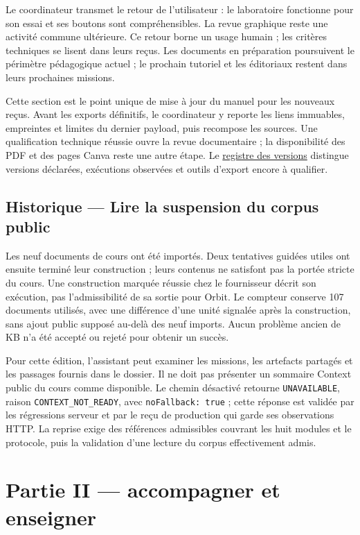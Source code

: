 \documentclass[
  canadien,
  11pt,
  a4paper,
]{report}
\begin{document}
Le coordinateur transmet le retour de l'utilisateur : le laboratoire
fonctionne pour son essai et ses boutons sont compréhensibles. La revue
graphique reste une activité commune ultérieure. Ce retour borne un
usage humain ; les critères techniques se lisent dans leurs reçus. Les
documents en préparation poursuivent le périmètre pédagogique actuel ;
le prochain tutoriel et les éditoriaux restent dans leurs prochaines
missions.

Cette section est le point unique de mise à jour du manuel pour les
nouveaux reçus. Avant les exports définitifs, le coordinateur y reporte
les liens immuables, empreintes et limites du dernier payload, puis
recompose les sources. Une qualification technique réussie ouvre la
revue documentaire ; la disponibilité des PDF et des pages Canva reste
une autre étape. Le \href{../TOOLCHAIN_AND_VERSIONS.md}{registre des
versions} distingue versions déclarées, exécutions observées et outils
d'export encore à qualifier.

\section{Historique --- Lire la suspension du corpus
public}\label{historique-lire-la-suspension-du-corpus-public}

Les neuf documents de cours ont été importés. Deux tentatives guidées
utiles ont ensuite terminé leur construction ; leurs contenus ne
satisfont pas la portée stricte du cours. Une construction marquée
réussie chez le fournisseur décrit son exécution, pas l'admissibilité de
sa sortie pour Orbit. Le compteur conserve 107 documents utilisés, avec
une différence d'une unité signalée après la construction, sans ajout
public supposé au-delà des neuf imports. Aucun problème ancien de KB n'a
été accepté ou rejeté pour obtenir un succès.

Pour cette édition, l'assistant peut examiner les missions, les
artefacts partagés et les passages fournis dans le dossier. Il ne doit
pas présenter un sommaire Context public du cours comme disponible. Le
chemin désactivé retourne \texttt{UNAVAILABLE}, raison
\texttt{CONTEXT\_\allowbreak{}NOT\_\allowbreak{}READY}, avec \texttt{no\allowbreak{}Fallback:\ true} ; cette
réponse est validée par les régressions serveur et par le reçu de
production qui garde ses observations HTTP. La reprise exige des
références admissibles couvrant les huit modules et le protocole, puis
la validation d'une lecture du corpus effectivement admis.

\chapter{Partie II --- accompagner et
enseigner}\label{partie-ii-accompagner-et-enseigner}
\end{document}
